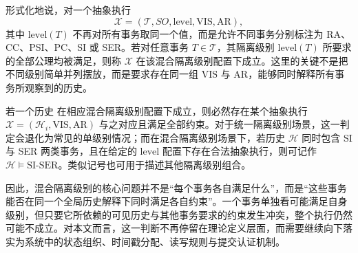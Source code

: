 形式化地说，对一个抽象执行
\[
  \mathcal{X} = (\mathcal{T}, SO, \text{level}, \text{VIS}, \text{AR}),
\]
其中 $\text{level}(T)$ 不再对所有事务取同一个值，而是允许不同事务分别标注为 RA、CC、PSI、PC、SI 或 SER。若对任意事务 $T \in \mathcal{T}$，其隔离级别 $\text{level}(T)$ 所要求的全部公理均被满足，则称 $\mathcal{X}$ 在该混合隔离级别配置下成立。这里的关键不是把不同级别简单并列摆放，而是要求存在同一组 $\text{VIS}$ 与 $\text{AR}$，能够同时解释所有事务所观察到的历史。

若一个历史 \History[i] 在相应混合隔离级别配置下成立，则必然存在某个抽象执行 $\mathcal{X} = (\mathcal{H}_i, \text{VIS}, \text{AR})$ 与之对应且满足全部约束。对于统一隔离级别场景，这一判定会退化为常见的单级别情况；而在混合隔离级别场景下，若历史 $\mathcal{H}$ 同时包含 SI 与 SER 两类事务，且在给定的 $\text{level}$ 配置下存在合法抽象执行，则可记作 $\mathcal{H} \vDash \text{SI-SER}$。类似记号也可用于描述其他隔离级别组合。

因此，混合隔离级别的核心问题并不是“每个事务各自满足什么”，而是“这些事务能否在同一个全局历史解释下同时满足各自约束”。一个事务单独看可能满足自身级别，但只要它所依赖的可见历史与其他事务要求的约束发生冲突，整个执行仍然可能不成立。对本文而言，这一判断不再停留在理论定义层面，而需要继续向下落实为系统中的状态组织、时间戳分配、读写规则与提交认证机制。

